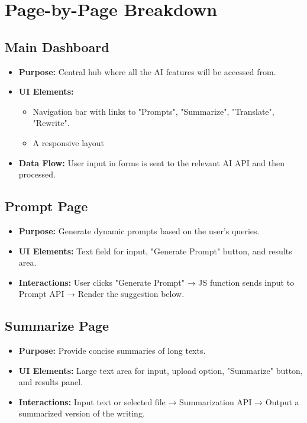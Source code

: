 \documentclass{article}
\begin{document}
\section{Page-by-Page Breakdown}
\subsection{Main Dashboard}
\begin{itemize}
    \item \textbf{Purpose:} Central hub where all the AI features will be accessed from.
    \item \textbf{UI Elements:}
    \begin{itemize}
        \item Navigation bar with links to "Prompts", "Summarize", "Translate", "Rewrite".
        \item A responsive layout
    \end{itemize}
    \item \textbf{Data Flow:} User input in forms is sent to the relevant AI API and then processed. 
\end{itemize}

\subsection{Prompt Page}
\begin{itemize}
    \item \textbf{Purpose:} Generate dynamic prompts based on the user's queries.
    \item \textbf{UI Elements:} Text field for input, "Generate Prompt" button, and results area.
    \item \textbf{Interactions:} User clicks "Generate Prompt" → JS function sends input to Prompt API → Render the suggestion below.
\end{itemize}

\subsection{Summarize Page}
\begin{itemize}
    \item \textbf{Purpose:} Provide concise summaries of long texts.
    \item \textbf{UI Elements:} Large text area for input, upload option, "Summarize" button, and results panel.
    \item \textbf{Interactions:} Input text or selected file → Summarization API → Output a summarized version of the writing.
\end{itemize}
\end{document}
